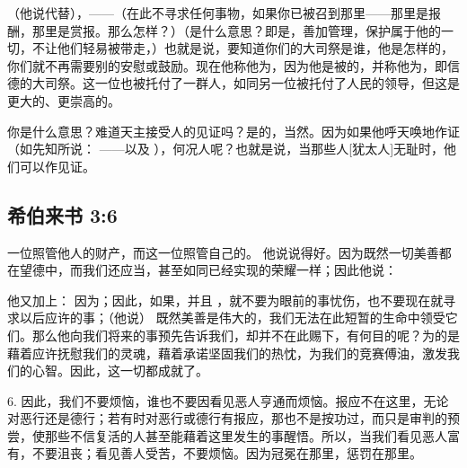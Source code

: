 （他说代替），——（在此不寻求任何事物，如果你已被召到那里——那里是报酬，那里是赏报。那么怎样？）（是什么意思？即是，善加管理，保护属于他的一切，不让他们轻易被带走，）也就是说，要知道你们的大司祭是谁，他是怎样的，你们就不再需要别的安慰或鼓励。现在他称他为，因为他是被的，并称他为，即信德的大司祭。这一位也被托付了一群人，如同另一位被托付了人民的领导，但这是更大的、更崇高的。\par

 你是什么意思？难道天主接受人的见证吗？是的，当然。因为如果他呼天唤地作证（如先知所说： ——以及 ），何况人呢？也就是说，当那些人[犹太人]无耻时，他们可以作见证。\par


\subsection{希伯来书 3:6}

 一位照管他人的财产，而这一位照管自己的。 他说说得好。因为既然一切美善都在望德中，而我们还应当，甚至如同已经实现的荣耀一样；因此他说：\par

他又加上：  因为；因此，如果，并且 ，就不要为眼前的事忧伤，也不要现在就寻求以后应许的事；（他说） 既然美善是伟大的，我们无法在此短暂的生命中领受它们。那么他向我们将来的事预先告诉我们，却并不在此赐下，有何目的呢？为的是藉着应许抚慰我们的灵魂，藉着承诺坚固我们的热忱，为我们的竞赛傅油，激发我们的心智。因此，这一切都成就了。\par

6. 因此，我们不要烦恼，谁也不要因看见恶人亨通而烦恼。报应不在这里，无论对恶行还是德行；若有时对恶行或德行有报应，那也不是按功过，而只是审判的预尝，使那些不信复活的人甚至能藉着这里发生的事醒悟。所以，当我们看见恶人富有，不要沮丧；看见善人受苦，不要烦恼。因为冠冕在那里，惩罚在那里。\par

